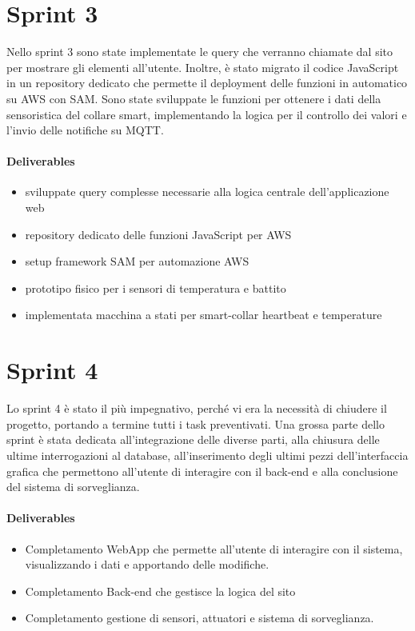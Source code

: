 \section{Sprint 3}
Nello sprint 3 sono state implementate le query che verranno chiamate dal sito per mostrare gli elementi all'utente. Inoltre, è stato migrato il codice JavaScript in un repository dedicato che permette il deployment delle funzioni in automatico su AWS con SAM. Sono state sviluppate le funzioni per ottenere i dati della sensoristica del collare smart, implementando la logica per il controllo dei valori e l'invio delle notifiche su MQTT.
\paragraph{Deliverables}
\begin{itemize}
    \item sviluppate query complesse necessarie alla logica centrale dell'applicazione web
    \item repository dedicato delle funzioni JavaScript per AWS
    \item setup framework SAM per automazione AWS
    \item prototipo fisico per i sensori di temperatura e battito
    \item implementata macchina a stati per smart-collar heartbeat e temperature
\end{itemize}

\section{Sprint 4}
Lo sprint 4 è stato il più impegnativo, perché vi era la necessità di chiudere il progetto, portando a termine tutti i task preventivati.
Una grossa parte dello sprint è stata dedicata all'integrazione delle diverse parti, alla chiusura delle ultime interrogazioni al database, all'inserimento degli ultimi pezzi dell'interfaccia grafica che permettono all'utente di interagire con il back-end e alla conclusione del sistema di sorveglianza.
\paragraph{Deliverables}
\begin{itemize}
    \item Completamento WebApp che permette all'utente di interagire con il sistema, visualizzando i dati e apportando delle modifiche.
    \item Completamento Back-end che gestisce la logica del sito
    \item Completamento gestione di sensori, attuatori e sistema di sorveglianza.
\end{itemize}

